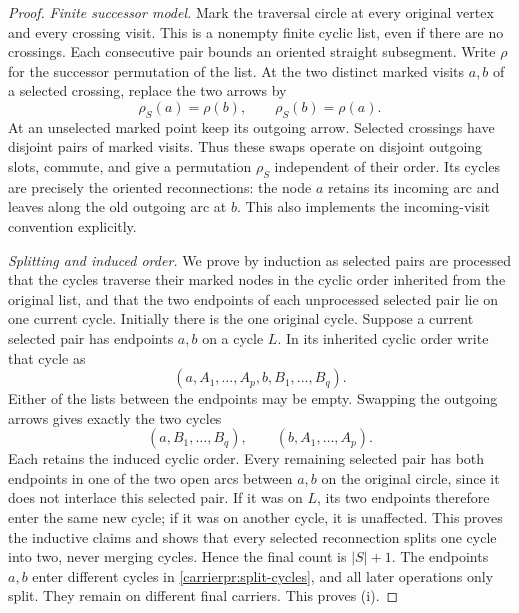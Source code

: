 \begin{proof}
\emph{Finite successor model.}
Mark the traversal circle at every original vertex and every crossing
visit. This is a nonempty finite cyclic list, even if there are no
crossings. Each consecutive pair bounds an oriented straight
subsegment. Write $\rho$ for the successor permutation of the list.
At the two distinct marked visits $a,b$ of a selected crossing, replace
the two arrows by
\begin{equation}\label{carrierpr:successors}
\rho_S(a)=\rho(b),\qquad \rho_S(b)=\rho(a).
\end{equation}
At an unselected marked point keep its outgoing arrow. Selected
crossings have disjoint pairs of marked visits. Thus these swaps
operate on disjoint outgoing slots, commute, and give a permutation
$\rho_S$ independent of their order. Its cycles are precisely the
oriented reconnections: the node $a$ retains its incoming arc and
leaves along the old outgoing arc at $b$. This also implements the
incoming-visit convention explicitly.

\emph{Splitting and induced order.}
We prove by induction as selected pairs are processed that the cycles
traverse their marked nodes in the cyclic order inherited from the
original list, and that the two endpoints of each unprocessed selected
pair lie on one current cycle. Initially there is the one original
cycle. Suppose a current selected pair has endpoints $a,b$ on a cycle
$L$. In its inherited cyclic order write that cycle as
\begin{equation}\label{carrierpr:split-list}
(a,A_1,\ldots,A_p,b,B_1,\ldots,B_q).
\end{equation}
Either of the lists between the endpoints may be empty. Swapping the
outgoing arrows gives exactly the two cycles
\begin{equation}\label{carrierpr:split-cycles}
(a,B_1,\ldots,B_q),\qquad (b,A_1,\ldots,A_p).
\end{equation}
Each retains the induced cyclic order. Every remaining selected pair
has both endpoints in one of the two open arcs between $a,b$ on the
original circle, since it does not interlace this selected pair.
If it was on $L$, its two endpoints therefore enter the same new cycle;
if it was on another cycle, it is unaffected. This proves the inductive
claims and shows that every selected reconnection splits one cycle
into two, never merging cycles. Hence the final count is $|S|+1$.
The endpoints $a,b$ enter different cycles in
\eqref{carrierpr:split-cycles}, and all later operations only split.
They remain on different final carriers. This proves (i).


\end{proof}
